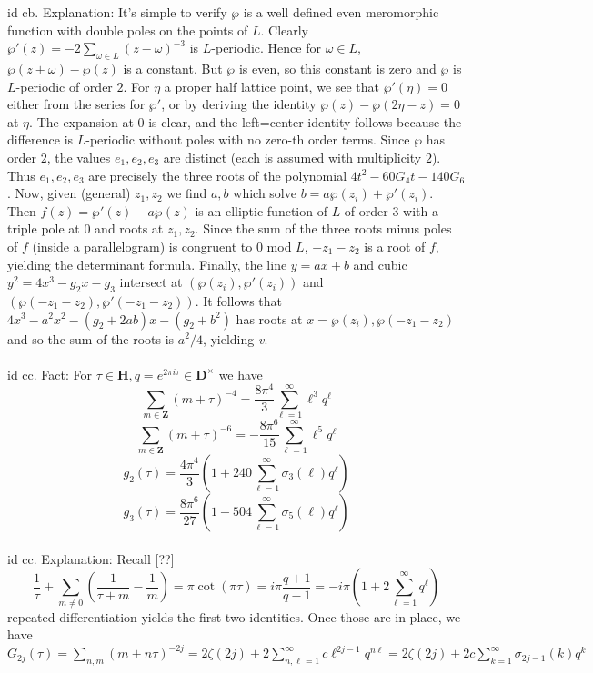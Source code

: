 \documentclass[oneside]{book}
\newcommand{\Z}{\mathbf{Z}}
\newcommand{\fit}[1]{\left( #1\right)}
\renewcommand{\v}{{\it v}. }
\renewcommand{\H}{\mathbf{H}}
\newcommand{\D}{\mathbf{D}}
\begin{document}
id cb. Explanation: It's simple to verify $\wp$ is a well defined even meromorphic function with double poles on the points of $L$. Clearly $\wp'(z)=-2\displaystyle\sum_{\omega\in L}(z-\omega)^{-3}$ is $L$-periodic. Hence for $\omega\in L$, $\wp(z+\omega)-\wp(z)$ is a constant. But $\wp$ is even, so this constant is zero and $\wp$ is $L$-periodic of order $2$. For $\eta$ a proper half lattice point, we see that $\wp'(\eta)=0$ either from the series for $\wp'$, or by deriving the identity $\wp(z)-\wp(2\eta-z)=0$ at $\eta$. The expansion at $0$ is clear, and the left=center identity follows because the difference is $L$-periodic without poles with no zero-th order terms. Since $\wp$ has order $2$, the values $e_1,e_2,e_3$ are distinct (each is assumed with multiplicity $2$). Thus $e_1,e_2,e_3$ are precisely the three roots of the polynomial $4t^2-60G_4t-140G_6$. Now, given (general) $z_1,z_2$ we find $a,b$ which solve $b=a\wp(z_i)+\wp'(z_i)$. Then $f(z)=\wp'(z)-a\wp(z)$ is an elliptic function of $L$ of order $3$ with a triple pole at $0$ and roots at $z_1,z_2$. Since the sum of the three roots minus poles of $f$ (inside a parallelogram) is congruent to $0$ mod $L$, $-z_1-z_2$ is a root of $f$, yielding the determinant formula. Finally, the line $y=ax+b$ and cubic $y^2=4x^3-g_2x-g_3$ intersect at $(\wp(z_i),\wp'(z_i))$ and $(\wp(-z_1-z_2),\wp'(-z_1-z_2))$. It follows that $4x^3-a^2x^2-(g_2+2ab)x-(g_2+b^2)$ has roots at $x=\wp(z_i),\wp(-z_1-z_2)$ and so the sum of the roots is $a^2/4$, yielding \v\\\\

id cc. Fact: For $\tau\in\H, q=e^{2\pi i\tau}\in\D^\times$ we have
$$\sum_{m\in\Z}(m+\tau)^{-4}=\dfrac{8\pi^4}{3}\sum_{\ell=1}^\infty \ell^3 q^{\ell}$$
$$\sum_{m\in\Z}(m+\tau)^{-6}=-\dfrac{8\pi^6}{15}\sum_{\ell=1}^\infty \ell^5 q^{\ell}$$
$$g_2(\tau)=\dfrac{4\pi^4}{3}\fit{1+240\sum_{\ell=1}^\infty \sigma_3(\ell) q^\ell}$$
$$g_3(\tau)=\dfrac{8\pi^6}{27}\fit{1-504\sum_{\ell=1}^\infty \sigma_5(\ell) q^\ell}$$\\


id cc. Explanation: Recall [??]
$$\dfrac{1}{\tau}+\sum_{m\neq 0}\fit{\dfrac{1}{\tau+m}-\dfrac{1}{m}}=\pi\cot(\pi \tau)=i\pi\dfrac{q+1}{q-1}=-i\pi\fit{1+2\sum_{\ell=1}^\infty q^\ell}$$
repeated differentiation yields the first two identities. Once those are in place, we have $G_{2j}(\tau)=\sum_{n,m}(m+n\tau)^{-2j}=2\zeta(2j)+2\sum_{n,\ell=1}^{\infty}c\ell^{2j-1}q^{n\ell}=2\zeta(2j)+2c\sum_{k=1}^{\infty} \sigma_{2j-1}(k)q^k$\\\\
\end{document}
